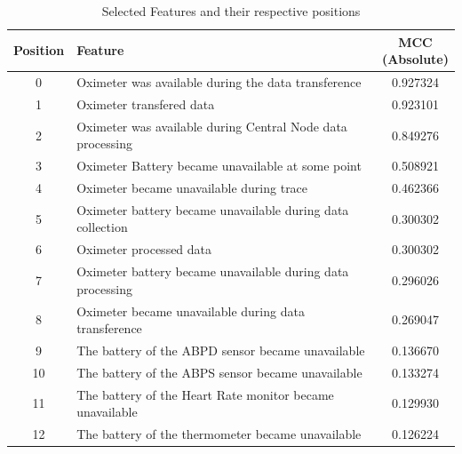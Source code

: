 \begin{table}[!h]
    \begin{tabular}{clc}
    \hline
    Position & Feature                                                    & \makecell{MCC \\ (Absolute)} \\ \hline
    0        & Oximeter was available during the data transference        & 0.927324                          \\
    1        & Oximeter transfered data                                   & 0.923101                          \\
    2        & Oximeter was available during Central Node data processing & 0.849276                          \\
    3        & Oximeter Battery became unavailable at some point          & 0.508921                          \\
    4        & Oximeter became unavailable during trace                   & 0.462366                          \\
    5        & Oximeter battery became unavailable during data collection & 0.300302                          \\
    6        & Oximeter processed data                                    & 0.300302                          \\
    7        & Oximeter battery became unavailable during data processing & 0.296026                          \\
    8        & Oximeter became unavailable during data transference       & 0.269047                          \\
    9        & The battery of the ABPD sensor became unavailable          & 0.136670                          \\
    10       & The battery of the ABPS sensor became unavailable          & 0.133274                          \\
    11       & The battery of the Heart Rate monitor became unavailable   & 0.129930                          \\
    12       & The battery of the thermometer became unavailable          & 0.126224                          \\ \hline
    \end{tabular}
    \label{tab:pos_features}
    \caption{Selected Features and their respective positions}
\end{table}


